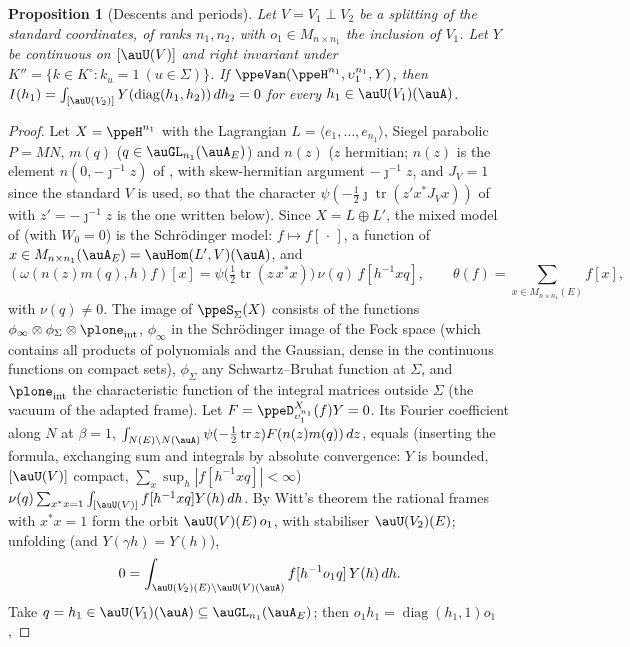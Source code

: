 \documentclass[10pt]{amsart}
\newtheorem{proposition}[theorem]{Proposition}
\theoremstyle{definition}
\theoremstyle{remark}
\begin{document}
\begin{proposition}[Descents and periods]\label{ppe:rallis}
Let $V=V_1\perp V_2$ be a splitting of the standard coordinates, of ranks $n_1,n_2$, with
$o_1\in M_{n\times n_1}$ the inclusion of $V_1$. Let $Y$ be continuous on $[\auU(V)]$ and right
invariant under $K''=\{k\in K^\circ:k_u=1\ (u\in\Sigma)\}$. If $\ppeVan(\ppeH^{n_1},\upsilon_1^{n_1},Y)$,
then $I(h_1)=\int_{[\auU(V_2)]}Y(\operatorname{diag}(h_1,h_2))\,dh_2=0$ for every $h_1\in\auU(V_1)(\auA)$.
\end{proposition}
\begin{proof}
Let $X=\ppeH^{n_1}$ with the Lagrangian $L=\langle e_1,\dots,e_{n_1}\rangle$, Siegel parabolic
$P=MN$, $m(q)$ ($q\in\auGL_{n_1}(\auA_E)$) and $n(z)$ ($z$ hermitian; $n(z)$ is the element
$n(0,-\jmath^{-1}z)$ of {\cite[\S3.2.3]{P53}}, with skew-hermitian argument $-\jmath^{-1}z$,
and $J_V=1$ since the standard $V$ is used, so that the character
$\psi(-\frac12\jmath\operatorname{tr}(z'x^*J_Vx))$ of {\cite[Lemma~3.62]{P53}} with $z'=-\jmath^{-1}z$ is the
one written below). Since $X=L\oplus L'$, the
mixed model of {\cite[Lemma~3.62]{P53}} (with $W_0=0$) is the Schr\"odinger model: $f\mapsto f[\,\cdot\,]$,
a function of $x\in M_{n\times n_1}(\auA_E)=\auHom(L',V)(\auA)$, and
\[
(\omega(n(z)m(q),h)f)[x]=\psi\bigl(\tfrac12\operatorname{tr}(z\,x^*x)\bigr)\,\nu(q)\,f[h^{-1}xq],
\qquad\theta(f)=\sum_{x\in M_{n\times n_1}(E)}f[x],
\]
with $\nu(q)\ne0$. The image of $\ppeS_\Sigma(X)$ consists of the functions $\phi_\infty\otimes
\phi_\Sigma\otimes\plone_{\mathrm{int}}$, $\phi_\infty$ in the Schr\"odinger image of the Fock space
(which contains all products of polynomials and the Gaussian, dense in the continuous functions on
compact sets), $\phi_\Sigma$ any Schwartz--Bruhat function at $\Sigma$, and $\plone_{\mathrm{int}}$
the characteristic function of the integral matrices outside $\Sigma$ (the vacuum of the adapted
frame). Let $F=\ppeD^X_{\upsilon_1^{n_1}}(f)Y=0$. Its Fourier coefficient along $N$ at $\beta=1$,
$\int_{N(E)\backslash N(\auA)}\psi(-\frac12\operatorname{tr}z)F(n(z)m(q))\,dz$, equals (inserting the
formula, exchanging sum and integrals by absolute convergence: $Y$ is bounded, $[\auU(V)]$ compact,
$\sum_x\sup_h|f[h^{-1}xq]|<\infty$) $\nu(q)\sum_{x^*x=1}\int_{[\auU(V)]}f[h^{-1}xq]Y(h)\,dh$. By
Witt's theorem the rational frames with $x^*x=1$ form the orbit $\auU(V)(E)\,o_1$, with stabiliser
$\auU(V_2)(E)$; unfolding (and $Y(\gamma h)=Y(h)$),
\[
0=\int_{\auU(V_2)(E)\backslash\auU(V)(\auA)}f[h^{-1}o_1q]\,Y(h)\,dh .
\]
Take $q=h_1\in\auU(V_1)(\auA)\subseteq\auGL_{n_1}(\auA_E)$; then $o_1h_1=\operatorname{diag}(h_1,1)o_1$,

\end{proof}
\end{document}
